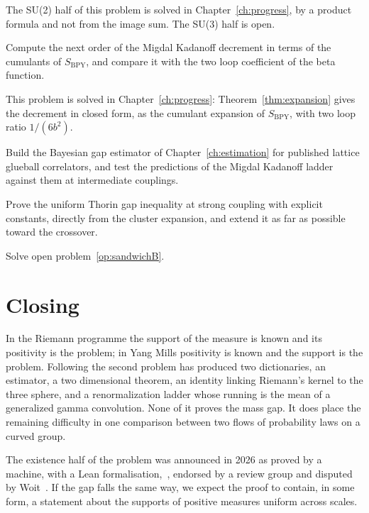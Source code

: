 The SU(2) half of this problem is solved in Chapter~\ref{ch:progress}, by a product formula and not from the image sum. The SU(3) half is open.

\begin{problem}\label{op:path3}
Compute the next order of the Migdal Kadanoff decrement in terms of the cumulants of $S_{\mathrm{BPY}}$, and compare it with the two loop coefficient of the beta function.
\end{problem}

This problem is solved in Chapter~\ref{ch:progress}: Theorem~\ref{thm:expansion} gives the decrement in closed form, as the cumulant expansion of $S_{\mathrm{BPY}}$, with two loop ratio $1/(6b^2)$.

\begin{problem}\label{op:path4}
Build the Bayesian gap estimator of Chapter~\ref{ch:estimation} for published lattice glueball correlators, and test the predictions of the Migdal Kadanoff ladder against them at intermediate couplings.
\end{problem}

\begin{problem}\label{op:path5}
Prove the uniform Thorin gap inequality at strong coupling with explicit constants, directly from the cluster expansion, and extend it as far as possible toward the crossover.
\end{problem}

\begin{problem}\label{op:path6}
Solve open problem~\ref{op:sandwichB}.
\end{problem}

\section{Closing}

In the Riemann programme the support of the measure is known and its positivity is the problem; in Yang Mills positivity is known and the support is the problem. Following the second problem has produced two dictionaries, an estimator, a two dimensional theorem, an identity linking Riemann's kernel to the three sphere, and a renormalization ladder whose running is the mean of a generalized gamma convolution. None of it proves the mass gap. It does place the remaining difficulty in one comparison between two flows of probability laws on a curved group.

The existence half of the problem was announced in 2026 as proved by a machine, with a Lean formalisation,~\cite{OAI}, endorsed by a review group and disputed by Woit~\cite{Woit26}. If the gap falls the same way, we expect the proof to contain, in some form, a statement about the supports of positive measures uniform across scales.

